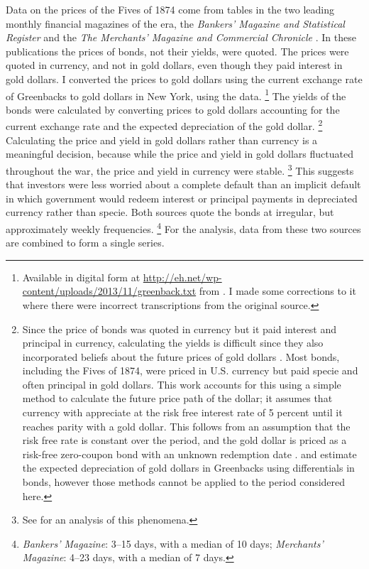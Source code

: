 Data on the prices of the Fives of 1874 come from tables in the two leading monthly financial magazines of the era, the \textit{Bankers' Magazine and Statistical Register} and the \textit{The Merchants' Magazine and Commercial Chronicle} \parencites[186]{Mitchell1903}.
In these publications the prices of bonds, not their yields, were quoted.
The prices were quoted in currency, and not in gold dollars, even though they paid interest in gold dollars.
I converted the prices to gold dollars using the current exchange rate of Greenbacks to gold dollars in New York, using the \textcite{Mitchell1908} data.%
\footnote{
  Available in digital form at \url{http://eh.net/wp-content/uploads/2013/11/greenback.txt} from \textcite{WillardGuinnaneEtAl1996}.
  I made some corrections to it where there were incorrect transcriptions from the original source.
}
The yields of the bonds were calculated by converting prices to gold dollars accounting for the current exchange rate and the expected depreciation of the gold dollar.%
\footnote{
  Since the price of bonds was quoted in currency but it paid interest and principal in currency, calculating the yields is difficult since they also incorporated beliefs about the future prices of gold dollars \parencites[Appendix A]{Macaulay1938}{Roll1972}{Calomiris1988}[302-303]{HomerSylla2005}.
  Most bonds, including the Fives of 1874, were priced in U.S. currency but paid specie and often principal in gold dollars.
  This work accounts for this using a simple method to calculate the future price path of the dollar; it assumes that currency with appreciate at the risk free interest rate of 5 percent until it reaches parity with a gold dollar.
  This follows from an assumption that the risk free rate is constant over the period, and the gold dollar is priced as a risk-free zero-coupon bond with an unknown redemption date \cite{McCandless1996}.
  \textcite{Roll1972} and \textcite{Calomiris1988} estimate the expected depreciation of gold dollars in Greenbacks using differentials in bonds, however those methods cannot be applied to the period considered here.
}
Calculating the price and yield in gold dollars rather than currency is a meaningful decision, because while the price and yield in gold dollars fluctuated throughout the war, the price and yield in currency were stable.%
\footnote{See \textcite{Roll1972} for an analysis of this phenomena.}
This suggests that investors were less worried about a complete default than an implicit default in which government would redeem interest or principal payments in depreciated currency rather than specie.
Both sources quote the bonds at irregular, but approximately weekly frequencies.
\footnote{\textit{Bankers' Magazine}: 3--15 days, with a median of 10 days; \textit{Merchants' Magazine}: 4--23 days, with a median of 7 days.}
For the analysis, data from these two sources are combined to form a single series.

